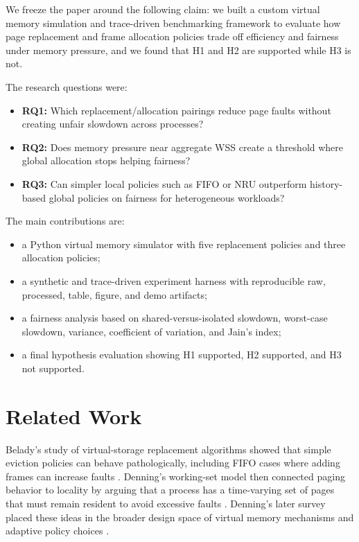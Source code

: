 \documentclass[conference]{IEEEtran}
\begin{document}
We freeze the paper around the following claim: we built a custom virtual memory simulation and trace-driven benchmarking framework to evaluate how page replacement and frame allocation policies trade off efficiency and fairness under memory pressure, and we found that H1 and H2 are supported while H3 is not.

The research questions were:
\begin{itemize}
  \item \textbf{RQ1:} Which replacement/allocation pairings reduce page faults without creating unfair slowdown across processes?
  \item \textbf{RQ2:} Does memory pressure near aggregate WSS create a threshold where global allocation stops helping fairness?
  \item \textbf{RQ3:} Can simpler local policies such as FIFO or NRU outperform history-based global policies on fairness for heterogeneous workloads?
\end{itemize}

The main contributions are:
\begin{itemize}
  \item a Python virtual memory simulator with five replacement policies and three allocation policies;
  \item a synthetic and trace-driven experiment harness with reproducible raw, processed, table, figure, and demo artifacts;
  \item a fairness analysis based on shared-versus-isolated slowdown, worst-case slowdown, variance, coefficient of variation, and Jain's index;
  \item a final hypothesis evaluation showing H1 supported, H2 supported, and H3 not supported.
\end{itemize}

\section{Related Work}
Belady's study of virtual-storage replacement algorithms showed that simple eviction policies can behave pathologically, including FIFO cases where adding frames can increase faults \cite{Belady1966}. Denning's working-set model then connected paging behavior to locality by arguing that a process has a time-varying set of pages that must remain resident to avoid excessive faults \cite{Denning1968}. Denning's later survey placed these ideas in the broader design space of virtual memory mechanisms and adaptive policy choices \cite{Denning1970}.
\end{document}
